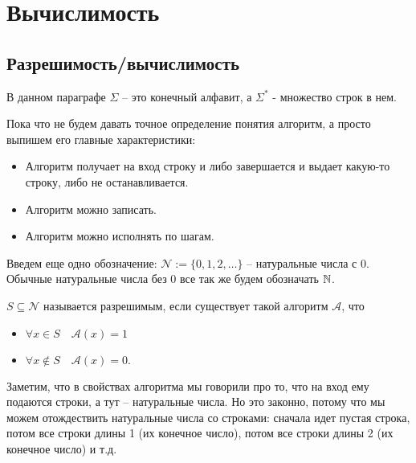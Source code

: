 \section{Вычислимость}
\subsection{Разрешимость/вычислимость}
В данном параграфе $\Sigma$ -- это конечный алфавит, а $\Sigma^*$ - множество строк в нем.

Пока что не будем давать точное определение понятия алгоритм, а просто выпишем его главные характеристики: 
\begin{itemize}
    \item Алгоритм получает на вход строку и либо завершается и выдает какую-то строку, либо не останавливается.
    \item Алгоритм можно записать.
    \item Алгоритм можно исполнять по шагам.
\end{itemize}
Введем еще одно обозначение: $\mathcal{N} := \{0, 1, 2, \dots \}$ -- натуральные числа с 0. Обычные натуральные числа без 0 все так же будем обозначать $\mathbb{N}$.

\begin{conj}
    $S \subseteq \mathcal{N}$ называется разрешимым, если существует такой алгоритм $\mathcal{A}$, что \begin{itemize}
        \item $\forall x \in S \quad \mathcal{A}(x) = 1$
        \item $\forall x \notin S \quad \mathcal{A}(x) = 0.$
    \end{itemize}
\end{conj}
Заметим, что в свойствах алгоритма мы говорили про то, что на вход ему подаются строки, а тут -- натуральные числа. Но это законно, потому что мы можем отождествить натуральные числа со строками: сначала идет пустая строка, потом все строки длины 1 (их конечное число), потом все строки длины 2 (их конечное число) и т.д.

